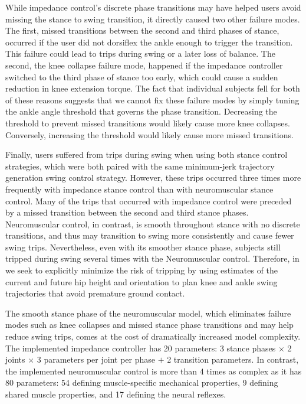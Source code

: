While impedance control's discrete phase transitions may have helped users avoid
missing the stance to swing transition, it directly caused two other failure
modes. The first, missed transitions between the second and third phases of
stance, occurred if the user did not dorsiflex the ankle enough to trigger the
transition. This failure could lead to trips during swing or a later loss of
balance. The second, the knee collapse failure mode, happened if the impedance
controller switched to the third phase of stance too early, which could cause a
sudden reduction in knee extension torque. The fact that individual subjects
fell for both of these reasons suggests that we cannot fix these failure modes
by simply tuning the ankle angle threshold that governs the phase transition.
Decreasing the threshold to prevent missed transitions would likely cause more
knee collapses. Conversely, increasing the threshold would likely cause more
missed transitions. 

Finally, users suffered from trips during swing when using both stance control
strategies, which were both paired with the same minimum-jerk trajectory
generation swing control strategy. However, these trips occurred three times
more frequently with impedance stance control than with neuromuscular stance
control. Many of the trips that occurred with impedance control were preceded by
a missed transition between the second and third stance phases. Neuromuscular
control, in contrast, is smooth throughout stance with no discrete transitions,
and thus may transition to swing more consistently and cause fewer swing trips.
Nevertheless, even with its smoother stance phase, subjects still tripped during
swing several times with the Neuromuscular control. Therefore, in
we seek to explicitly minimize the risk of tripping by using estimates of the
current and future hip height and orientation to plan knee and ankle swing
trajectories that avoid premature ground contact.

The smooth stance phase of the neuromuscular model, which eliminates failure
modes such as knee collapses and missed stance phase transitions and may help
reduce swing trips, comes at the cost of dramatically increased model
complexity. The implemented impedance controller has 20 parameters: 3 stance
phases $\times$ 2 joints $\times$ 3 parameters per joint per phase $+$ 2
transition parameters. In contrast, the implemented neuromuscular control is
more than 4 times as complex as it has 80 parameters: 54 defining
muscle-specific mechanical properties, 9 defining shared muscle properties, and
17 defining the neural reflexes. 

